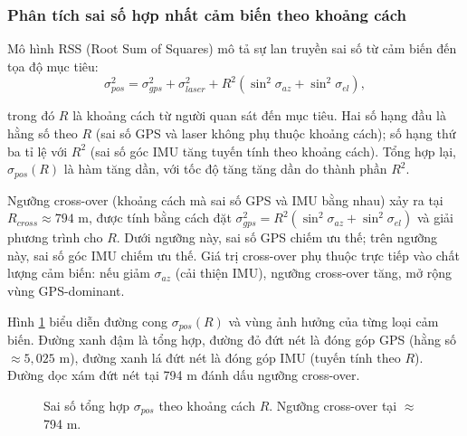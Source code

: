 \subsubsection{Phân tích sai số hợp nhất cảm biến theo khoảng cách}

\hspace{0.5cm} Mô hình RSS (Root Sum of Squares) mô tả sự lan truyền sai số từ cảm biến đến tọa độ mục tiêu:
\begin{equation}
\sigma_{pos}^2 = \sigma_{gps}^2 + \sigma_{laser}^2 + R^2 \left(\sin^2\sigma_{az} + \sin^2\sigma_{el}\right),
\label{eq:rss-fusion}
\end{equation}

trong đó $R$ là khoảng cách từ người quan sát đến mục tiêu. Hai số hạng đầu là hằng số theo $R$ (sai số GPS và laser không phụ thuộc khoảng cách); số hạng thứ ba tỉ lệ với $R^2$ (sai số góc IMU tăng tuyến tính theo khoảng cách). Tổng hợp lại, $\sigma_{pos}(R)$ là hàm tăng dần, với tốc độ tăng tăng dần do thành phần $R^2$.

Ngưỡng cross-over (khoảng cách mà sai số GPS và IMU bằng nhau) xảy ra tại $R_{cross} \approx 794$ m, được tính bằng cách đặt $\sigma_{gps}^2 = R^2(\sin^2\sigma_{az} + \sin^2\sigma_{el})$ và giải phương trình cho $R$. Dưới ngưỡng này, sai số GPS chiếm ưu thế; trên ngưỡng này, sai số góc IMU chiếm ưu thế. Giá trị cross-over phụ thuộc trực tiếp vào chất lượng cảm biến: nếu giảm $\sigma_{az}$ (cải thiện IMU), ngưỡng cross-over tăng, mở rộng vùng GPS-dominant.

Hình \ref{fig:sigma-vs-range} biểu diễn đường cong $\sigma_{pos}(R)$ và vùng ảnh hưởng của từng loại cảm biến. Đường xanh đậm là tổng hợp, đường đỏ đứt nét là đóng góp GPS (hằng số $\approx 5{,}025$ m), đường xanh lá đứt nét là đóng góp IMU (tuyến tính theo $R$). Đường dọc xám đứt nét tại 794 m đánh dấu ngưỡng cross-over.

\begin{figure}[H]
\centering
{}
\caption{Sai số tổng hợp $\sigma_{pos}$ theo khoảng cách $R$. Ngưỡng cross-over tại $\approx$794 m.}
\label{fig:sigma-vs-range}
\end{figure}


